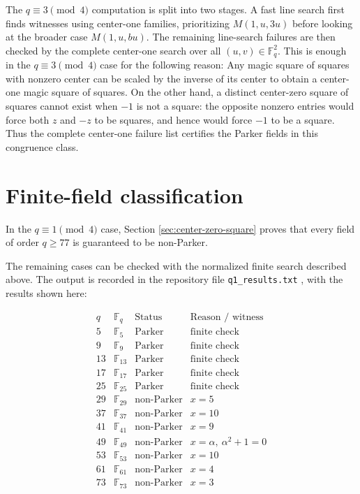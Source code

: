 \documentclass{article}
\newcommand{\F}{\mathbb F}
\theoremstyle{definition}
\numberwithin{equation}{section}
\begin{document}
The \(q\equiv3\pmod4\) computation is split into two stages.  A fast line search first finds witnesses using center-one families, prioritizing \(M(1,u,3u)\) before looking at the broader case \(M(1,u,bu)\).  The remaining line-search failures are then checked by the complete center-one search over all \((u,v)\in\F_q^2\).  This is enough in the \(q\equiv3\pmod4\) case for the following reason: Any magic square of squares with nonzero center can be scaled by the inverse of its center to obtain a center-one magic square of squares. On the other hand, a distinct center-zero square of squares cannot exist when \(-1\) is not a square: the opposite nonzero entries would force both \(z\) and \(-z\) to be squares, and hence would force \(-1\) to be a square. Thus the complete center-one failure list certifies the Parker fields in this congruence class.

\section{Finite-field classification}

In the \(q\equiv1\pmod4\) case, Section \ref{sec:center-zero-square} proves that every field of order \(q\geq77\) is guaranteed to be non-Parker.

The remaining cases can be checked with the normalized finite search described above.  The output is recorded in the repository file \texttt{q1\_results.txt} \cite{magicSquaresFieldsRepo}, with the results shown here:

\[
\begin{array}{c|c|c|c}
q & \F_q & \text{Status} & \text{Reason / witness} \\
\hline
5  & \F_5   & \text{Parker} & \text{finite check} \\
9  & \F_9   & \text{Parker} & \text{finite check} \\
13 & \F_{13} & \text{Parker} & \text{finite check} \\
17 & \F_{17} & \text{Parker} & \text{finite check} \\
25 & \F_{25} & \text{Parker} & \text{finite check} \\
\hline
29 & \F_{29} & \text{non-Parker} & x=5 \\
37 & \F_{37} & \text{non-Parker} & x=10 \\
41 & \F_{41} & \text{non-Parker} & x=9 \\
49 & \F_{49} & \text{non-Parker} & x=\alpha,\ \alpha^2+1=0 \\
53 & \F_{53} & \text{non-Parker} & x=10 \\
61 & \F_{61} & \text{non-Parker} & x=4 \\
73 & \F_{73} & \text{non-Parker} & x=3
\end{array}
\]
\end{document}
